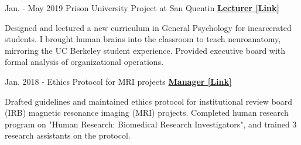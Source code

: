 \begin{cventries}
  \cventry
    {Jan. - May 2019} %
    {Prison University Project at San Quentin}
    {\href{https://www.neh.gov/about/awards/national-humanities-medals/prison-university-project}{\textbf{Lecturer [Link]}}} %
    {} %
    {
      \begin{cvitems} %
        \item {Designed and lectured a new curriculum in General Psychology for incarcerated students. I brought human brains into the classroom to teach neuroanatomy, mirroring the UC Berkeley student experience. Provided executive board with formal analysis of organizational operations.}
      \end{cvitems}
    }
    
  \cventry 
    {Jan. 2018 - } %
    {Ethics Protocol for MRI projects}
    {\href{https://drive.google.com/file/d/1h66emU7-TRl-mSLZTEH01E3Qf5ZpEdbv/view?usp=sharing}{\textbf{Manager [Link]}}} %
    {} %
    {
      \begin{cvitems} %
      	\item {Drafted guidelines and maintained ethics protocol for institutional review board (IRB) magnetic resonance imaging (MRI) projects. Completed human research program on "Human Research: Biomedical Research Investigators", and trained 3 research assistants on the protocol.}
      \end{cvitems}
    }

\end{cventries}


